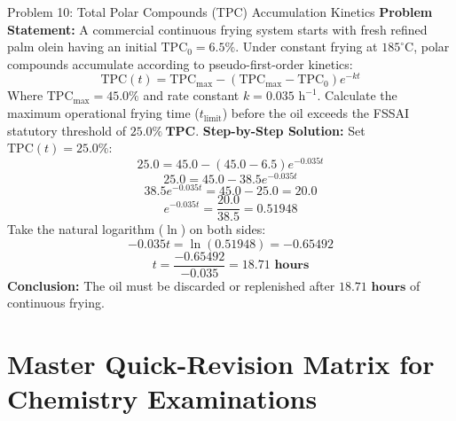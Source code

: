 \documentclass[11pt,a4paper,oneside]{article}
\begin{document}
\begin{examplebox}{Problem 10: Total Polar Compounds (TPC) Accumulation Kinetics}
\textbf{Problem Statement:}
A commercial continuous frying system starts with fresh refined palm olein having an initial $\text{TPC}_0 = 6.5\%$. Under constant frying at $185^\circ\text{C}$, polar compounds accumulate according to pseudo-first-order kinetics:
$$\text{TPC}(t) = \text{TPC}_{\text{max}} - (\text{TPC}_{\text{max}} - \text{TPC}_0) e^{-k t}$$
Where $\text{TPC}_{\text{max}} = 45.0\%$ and rate constant $k = 0.035\text{ h}^{-1}$.
Calculate the maximum operational frying time ($t_{\text{limit}}$) before the oil exceeds the FSSAI statutory threshold of $\mathbf{25.0\%\ \text{TPC}}$.
\vspace{0.2cm}
\textbf{Step-by-Step Solution:}
Set $\text{TPC}(t) = 25.0\%$:
$$25.0 = 45.0 - (45.0 - 6.5) e^{-0.035 t}$$
$$25.0 = 45.0 - 38.5 e^{-0.035 t}$$
$$38.5 e^{-0.035 t} = 45.0 - 25.0 = 20.0$$
$$e^{-0.035 t} = \frac{20.0}{38.5} = 0.51948$$
Take the natural logarithm ($\ln$) on both sides:
$$-0.035 t = \ln(0.51948) = -0.65492$$
$$t = \frac{-0.65492}{-0.035} = \mathbf{18.71\text{ hours}}$$
\textbf{Conclusion:} The oil must be discarded or replenished after $\mathbf{18.71\text{ hours}}$ of continuous frying.
\end{examplebox}

\newpage

\section{Master Quick-Revision Matrix for Chemistry Examinations}
\end{document}
